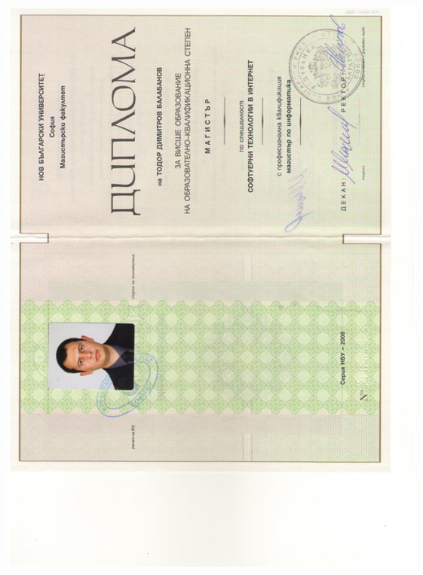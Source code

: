 \documentclass[bulgarian,a4paper]{europasscv}
\begin{document}
\includegraphics[width=\textwidth,height=\textheight,keepaspectratio]{DiplomaNBU2008_2}
\end{document}
